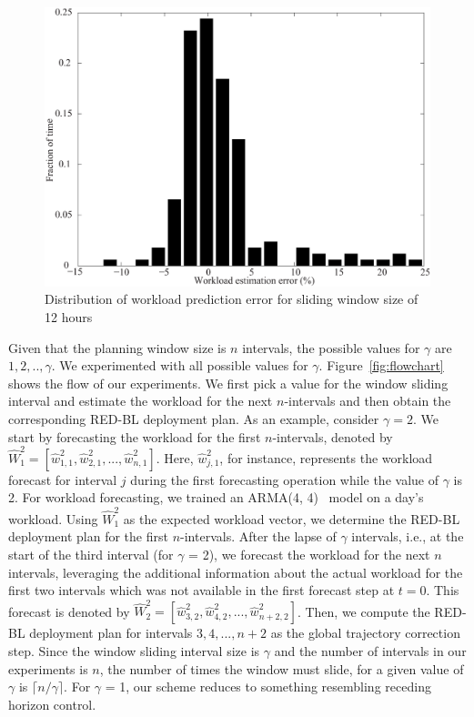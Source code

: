 \begin{figure}
\centering
\includegraphics[width=0.7\linewidth]{pics/workload-pred-error-2.eps}
    \caption{Distribution of workload prediction error for sliding window size of 12 hours}
    \label{fig:workload-pred-error-dist}
    \end{figure}
    
    Given that the planning window size is $n$ intervals, the possible values for $\gamma$ are $1, 2, .., \gamma$. We experimented with all possible values for $\gamma$. Figure~\ref{fig:flowchart} shows the flow of our experiments. We first pick a value for the window sliding interval and estimate the workload for the next $n$-intervals and then obtain the corresponding RED-BL deployment plan. As an example, consider $\gamma=2$. We start by forecasting the workload for the first $n$-intervals, denoted by $\hat{W}_1^2 = [\hat{w}_{1,1}^2, \hat{w}_{2,1}^2, ..., \hat{w}_{n,1}^2]$. Here, $\hat{w}_{j,1}^2$, for instance, represents the workload forecast for interval $j$ during the first forecasting operation while the value of $\gamma$ is 2. For workload forecasting, we trained an ARMA(4, 4)~\cite{arma} model on a day's workload. Using $\hat{W}^2_1$ as the expected workload vector, we determine the RED-BL deployment plan for the first $n$-intervals. After the lapse of $\gamma$ intervals, i.e., at the start of the third interval (for $\gamma$ = 2), we forecast the workload for the next $n$ intervals, leveraging the additional information about the actual workload for the first two intervals which was not available in the first forecast step at $t=0$. This forecast is denoted by $\hat{W}_2^2 = [\hat{w}_{3,2}^2, \hat{w}_{4,2}^2, ..., \hat{w}_{n+2,2}^2]$. Then, we compute the RED-BL deployment plan for intervals $3, 4,..., n+2$ as the global trajectory correction step. Since the window sliding interval size is $\gamma$ and the number of intervals in our experiments is $n$, the number of times the window must slide, for a given value of $\gamma$ is $\lceil n/\gamma \rceil$. For $\gamma$ = 1, our scheme reduces to something resembling receding horizon control.
    

